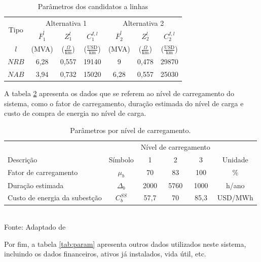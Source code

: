 \begin{table}[ht]
\centering
\caption{Parâmetros dos candidatos a linhas}
\label{tab:param_linha}
\begin{tabular}{@{}ccccccc@{}}
\toprule
\multirow{2}{*}{Tipo} & \multicolumn{3}{c}{Alternativa 1}              & \multicolumn{3}{c}{Alternativa 2}              \\ \cmidrule(l){2-7} 
                      & $\overline{F}^{l}_1$ & $Z^{l}_1$ & $C^{I,l}_1$ & $\overline{F}^{l}_2$ & $Z^{l}_2$ & $C^{I,l}_2$ \\ \midrule
$l$ & (MVA) & ($\frac{\Omega}{\text{km}}$) & ($\frac{\text{USD}}{\text{km}}$) & (MVA) & ($\frac{\Omega}{\text{km}}$) & ($\frac{\text{USD}}{\text{km}}$) \\ \midrule
$NRB$                 & 6,28                 & 0,557     & 19140       & 9                    & 0,478     & 29870       \\ \midrule
$NAB$                 & 3,94                 & 0,732     & 15020       & 6,28                 & 0,557     & 25030       \\ \bottomrule
\end{tabular}
\end{table}

\newpage
A tabela \ref{tab:param_carrega} apresenta os dados que se referem ao nível de carregamento do sistema, como o fator de carregamento, duração estimada do nível de carga e custo de compra de energia no nível de carga.
\begin{table}[ht]
\centering
\caption{Parâmetros por nível de carregamento.}
\label{tab:param_carrega}
\begin{tabular}{@{}lccccc@{}}
\toprule
                              &            & \multicolumn{3}{c}{Nível de carregamento} &         \\ \cmidrule(l){2-6} 
Descrição                         & Símbolo    & 1             & 2             & 3             & Unidade \\ \midrule
Fator de carregamento         & $\mu_b$    & 70            & 83            & 100           & \%      \\
Duração estimada              & $\Delta_b$ & 2000          & 5760          & 1000          & h/ano   \\
Custo de energia da subestção & $C^{SS}_b$ & 57,7          & 70            & 85,3          & USD/MWh \\ \bottomrule
\end{tabular}
\\Fonte: Adaptado de 
\end{table}

Por fim, a tabela \ref{tab:param} apresenta outros dados utilizados neste sistema, incluindo os dados financeiros, ativos já instalados, vida útil, etc.
